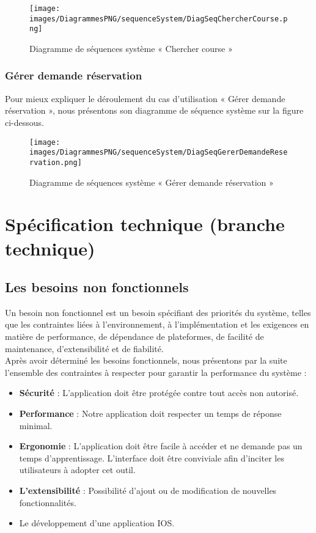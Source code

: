 {\begin{figure}[H]
\centering
\texttt{[image: images/DiagrammesPNG/sequenceSystem/DiagSeqChercherCourse.png]}
\caption{Diagramme de séquences système « Chercher course »}
\end{figure}

\newpage
\subsubsection{Gérer demande réservation}
Pour mieux expliquer le déroulement du cas d'utilisation « Gérer demande réservation », nous présentons son diagramme de séquence système sur la figure ci-dessous.

\begin{figure}[H]
\centering
\texttt{[image: images/DiagrammesPNG/sequenceSystem/DiagSeqGererDemandeReservation.png]}
\caption{Diagramme de séquences système « Gérer demande réservation »}
\end{figure}

\section{Spécification technique (branche technique)}
\subsection{Les besoins non fonctionnels}
Un besoin non fonctionnel est un besoin spécifiant des priorités du système, telles que les contraintes liées à l'environnement, à l'implémentation et les exigences en matière de performance, de dépendance de plateformes, de facilité de maintenance, d'extensibilité et de fiabilité.\\

Après avoir déterminé les besoins fonctionnels, nous présentons par la suite l'ensemble des contraintes à respecter pour garantir la performance du système :
\begin{itemize}
\item \textbf{Sécurité} : L'application doit être protégée contre tout accès non autorisé.
\item \textbf{Performance} : Notre application doit respecter un temps de réponse minimal.
\item \textbf{Ergonomie} : L'application doit être facile à accéder et ne demande pas un temps d'apprentissage. L'interface doit être conviviale afin d'inciter les utilisateurs à adopter cet outil.
\item \textbf{L'extensibilité} : Possibilité d'ajout ou de modification de nouvelles fonctionnalités.
\item Le développement d'une application IOS.
\end{itemize}

}
